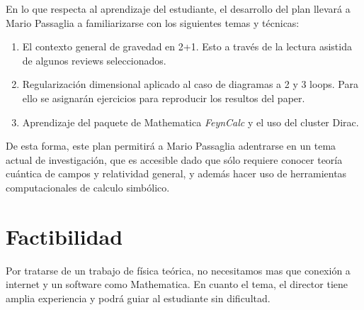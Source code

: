 \documentclass[A4paper,12pt]{article}
\begin{document}
En lo que respecta al aprendizaje del estudiante, el desarrollo del plan llevará a Mario Passaglia a familiarizarse con los siguientes temas y técnicas:

\begin{enumerate}
	\item El contexto general de gravedad en 2+1. Esto a través de la lectura asistida de algunos reviews seleccionados.
	\item Regularización dimensional aplicado al caso de diagramas a 2 y 3 loops. Para ello se asignarán ejercicios para reproducir los resultos del paper.
	\item Aprendizaje del paquete de Mathematica {\it FeynCalc} y el uso del cluster Dirac.
\end{enumerate}


De esta forma, este plan permitirá a Mario Passaglia adentrarse en un tema actual de investigación, que es accesible dado que sólo requiere conocer teoría cuántica de campos y relatividad general, y además hacer uso de herramientas computacionales de calculo simbólico.


\section*{Factibilidad}

Por tratarse de un trabajo de física teórica, no necesitamos mas que conexión a internet y un software como Mathematica. 
En cuanto el tema, el director tiene amplia experiencia  y podrá guiar al estudiante sin dificultad.


{}
\end{document}
